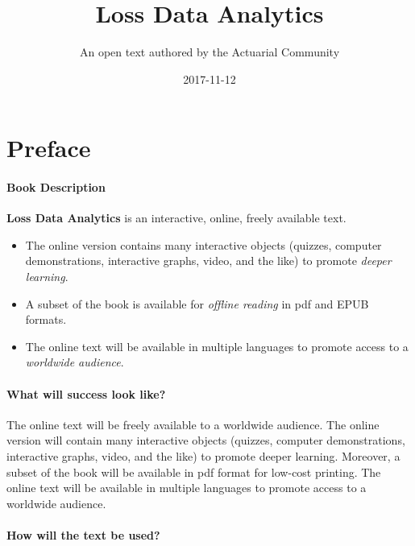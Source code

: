 \documentclass[]{book}
\title{Loss Data Analytics}
\author{An open text authored by the Actuarial Community}
\date{2017-11-12}
\theoremstyle{definition}
\theoremstyle{definition}
\theoremstyle{definition}
\theoremstyle{remark}
\begin{document}
\maketitle

{
\setcounter{tocdepth}{2}
\tableofcontents
}
\chapter*{Preface}\label{preface}

\subsubsection*{Book Description}\label{book-description}

\textbf{Loss Data Analytics} is an interactive, online, freely available
text.

\begin{itemize}
\item
  The online version contains many interactive objects (quizzes,
  computer demonstrations, interactive graphs, video, and the like) to
  promote \emph{deeper learning}.
\item
  A subset of the book is available for \emph{offline reading} in pdf
  and EPUB formats.
\item
  The online text will be available in multiple languages to promote
  access to a \emph{worldwide audience}.
\end{itemize}

\subsubsection*{What will success look
like?}\label{what-will-success-look-like}

The online text will be freely available to a worldwide audience. The
online version will contain many interactive objects (quizzes, computer
demonstrations, interactive graphs, video, and the like) to promote
deeper learning. Moreover, a subset of the book will be available in pdf
format for low-cost printing. The online text will be available in
multiple languages to promote access to a worldwide audience.

\subsubsection*{How will the text be
used?}\label{how-will-the-text-be-used}
\end{document}
